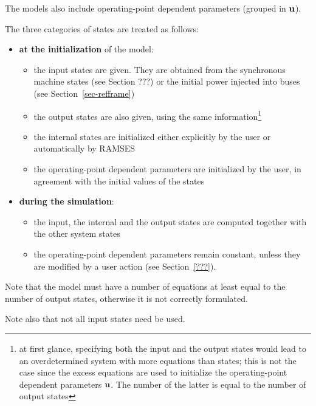 The models also include operating-point dependent parameters (grouped in $\bf u$).

The three categories of states are treated as follows:
\begin{itemize}
\item {\bf \large at the initialization} of the model: 
\begin{itemize}
\item the input states are given. They are obtained from the synchronous machine states (see Section ???) or the initial power injected into buses (see Section~\ref{sec-refframe})
\item the output states are also given, using the same information\footnote{at first glance, specifying both the input and the output states would lead to an overdetermined system with more equations than states; this is not the case since the excess equations are used to initialize the operating-point dependent parameters $\bf u$. The number of the latter is equal to the number of output states}
\item the internal states are initialized either explicitly by the user or automatically by RAMSES
\item the operating-point dependent parameters are initialized by the user, in agreement with the initial values of the states
\end{itemize}
\item {\bf \large during the simulation}:
\begin{itemize}
\item the input, the internal and the output states are computed together with the other system states
\item the operating-point dependent parameters remain constant, unless they are modified by a user action (see Section~\ref{???}).
\end{itemize}
\end{itemize}

Note that the model must have a number of equations at least equal to the number of output states, otherwise it is not correctly formulated.

Note also that not all input states need be used.

